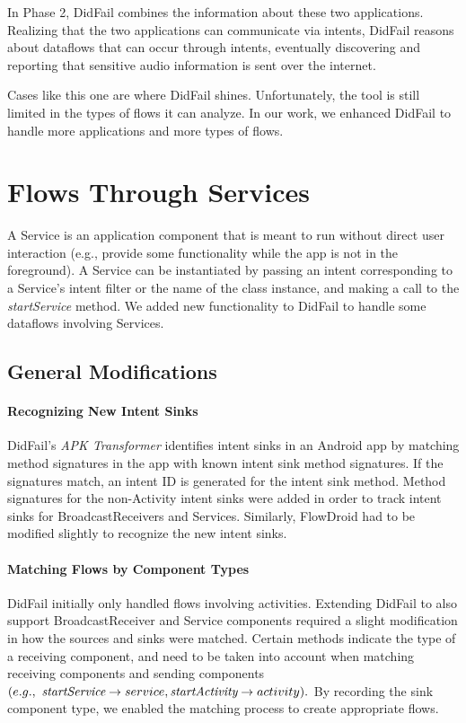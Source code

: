 In Phase 2, DidFail combines the information about these two applications. Realizing that the two applications can communicate via intents, DidFail reasons about dataflows that can occur through intents, eventually discovering and reporting that sensitive audio information is sent over the internet. 

Cases like this one are where DidFail shines. 
Unfortunately, the tool is still limited in the types of flows it can analyze. In our work, we enhanced DidFail to handle more applications and more types of flows.


\chapter{Flows Through Services}
A Service is an application component that is meant to run without direct user interaction (e.g., provide some functionality while the app is not in the foreground). A Service can be instantiated by passing an intent corresponding to a Service's intent filter or the name of the class instance, and making a call to the \emph{startService} method. We added new functionality to DidFail to handle some dataflows involving Services.  

\section{General Modifications}
\subsubsection{Recognizing New Intent Sinks}
DidFail's \emph{APK Transformer} identifies intent sinks in an Android app by matching method signatures in the app with known intent sink method signatures. If the signatures match, an intent ID is generated for the intent sink method. Method signatures for the non-Activity intent sinks were added in order to track intent sinks for BroadcastReceivers and Services. Similarly, FlowDroid had to be modified slightly to recognize the new intent sinks. 

\subsubsection{Matching Flows by Component Types}
DidFail initially only handled flows involving activities. Extending DidFail to also support BroadcastReceiver and Service components required a slight modification in how the sources and sinks were matched. Certain methods indicate the type of a receiving component, and need to be taken into account when matching receiving components and sending components $(e.g.,\  \emph{startService} \rightarrow service, \emph{startActivity} \rightarrow activity).$ By recording the sink component type, we enabled the matching process to create appropriate flows.

